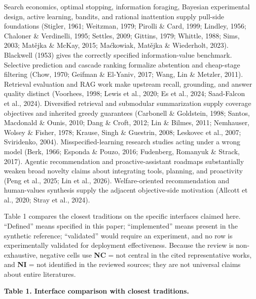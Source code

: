 \documentclass[
  11pt]{article}
\begin{document}
Search economics, optimal stopping, information foraging, Bayesian
experimental design, active learning, bandits, and rational inattention
supply pull-side foundations (Stigler, 1961; Weitzman, 1979; Pirolli \&
Card, 1999; Lindley, 1956; Chaloner \& Verdinelli, 1995; Settles, 2009;
Gittins, 1979; Whittle, 1988; Sims, 2003; Matějka \& McKay, 2015;
Maćkowiak, Matějka \& Wiederholt, 2023). Blackwell (1953) gives the
correctly specified information-value benchmark. Selective prediction
and cascade ranking formalize abstention and cheap-stage filtering
(Chow, 1970; Geifman \& El-Yaniv, 2017; Wang, Lin \& Metzler, 2011).
Retrieval evaluation and RAG work make upstream recall, grounding, and
answer quality distinct (Voorhees, 1998; Lewis et al., 2020; Es et al.,
2024; Saad-Falcon et al., 2024). Diversified retrieval and submodular
summarization supply coverage objectives and inherited greedy guarantees
(Carbonell \& Goldstein, 1998; Santos, Macdonald \& Ounis, 2010; Dang \&
Croft, 2012; Lin \& Bilmes, 2011; Nemhauser, Wolsey \& Fisher, 1978;
Krause, Singh \& Guestrin, 2008; Leskovec et al., 2007; Sviridenko,
2004). Misspecified-learning research studies acting under a wrong model
(Berk, 1966; Esponda \& Pouzo, 2016; Fudenberg, Romanyuk \& Strack,
2017). Agentic recommendation and proactive-assistant roadmaps
substantially weaken broad novelty claims about integrating tools,
planning, and proactivity (Peng et al., 2025; Lin et al., 2026).
Welfare-oriented recommendation and human-values synthesis supply the
adjacent objective-side motivation (Allcott et al., 2020; Stray et al.,
2024).

Table 1 compares the closest traditions on the specific interfaces
claimed here. ``Defined'' means specified in this paper; ``implemented''
means present in the synthetic reference; ``validated'' would require an
experiment, and no row is experimentally validated for deployment
effectiveness. Because the review is non-exhaustive, negative cells use
\textbf{NC} = not central in the cited representative works, and
\textbf{NI} = not identified in the reviewed sources; they are not
universal claims about entire literatures.

\textbf{Table 1. Interface comparison with closest traditions.}
\end{document}
